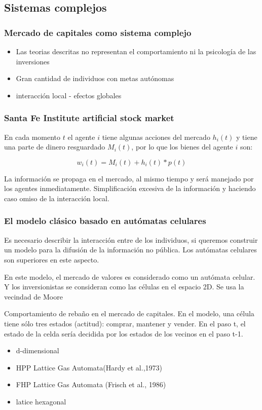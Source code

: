 \documentclass[hyperref={pdfpagelabels=false}]{beamer}
\begin{document}
\subsection{Sistemas complejos}
\begin{frame}
\frametitle{Mercado de capitales como sistema complejo}
\begin{itemize}
\item Las teorias descritas no representan el comportamiento ni la psicología de las inversiones
\item Gran cantidad de individuos con metas autónomas
\item interacción local - efectos globales
\end{itemize} 
\end{frame}

\begin{frame}
\frametitle{Santa Fe Institute artificial stock market}
En cada momento $t$ el agente $i$ tiene algunas acciones del mercado $h_i(t)$ y tiene una parte de dinero resguardado $M_i(t)$, por lo que los bienes del agente $i$ son:

$$ w_i(t)= M_i(t)+h_i(t)*p(t)$$

La información se propaga en el mercado, al mismo tiempo y será manejado por los agentes inmediatamente. Simplificación excesiva de la información y haciendo caso omiso de la interacción local.
\end{frame}

\begin{frame}
\frametitle{El modelo clásico basado en autómatas celulares}
Es necesario describir la interacción entre de los individuos, si queremos construir un modelo para la difusión de la información no pública. Los autómatas celulares son superiores en este aspecto.

En este modelo, el mercado de valores es considerado como un autómata celular. Y los inversionistas se consideran como las células en el espacio 2D. Se usa la vecindad de Moore


Comportamiento de rebaño en el mercado de capitales. En el modelo, una célula tiene sólo tres estados (actitud): comprar, mantener y vender. En el paso t, el estado de la celda sería decidida por los estados de los vecinos en el paso t-1.

\begin{itemize}
\item d-dimensional
\item HPP Lattice Gas Automata(Hardy et al.,1973)
\item FHP Lattice Gas Automata (Frisch et al., 1986)
\item latice hexagonal
\end{itemize} 

\end{frame}
\end{document}
